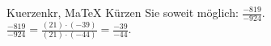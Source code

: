 \begin{MAufgabe}{Kuerzen}{kr, MaTeX}
K\"urzen Sie soweit m\"oglich: $\frac{-819}{-924}$.\\ 
\ifLsg\MLoesung
\quad $\frac{-819}{-924}=\frac{(21)\cdot(-39)}{(21)\cdot(-44)}=\frac{-39}{-44}$.\else\relax\fi
 \end{MAufgabe}